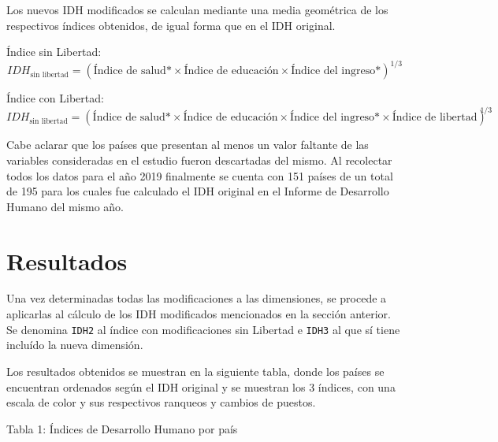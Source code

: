 \documentclass[
  10pt,
]{article}
\begin{document}
Los nuevos IDH modificados se calculan mediante una media geométrica de
los respectivos índices obtenidos, de igual forma que en el IDH
original.

Índice sin Libertad:
\[IDH_\text{sin libertad} = (\text{Índice de salud*}\times\text{Índice de educación}\times\text{Índice del ingreso*})^{1/3}\]

Índice con Libertad:
\[IDH_\text{sin libertad} = (\text{Índice de salud*}\times\text{Índice de educación}\times\text{Índice del ingreso*}\times\text{Índice de libertad})^{1/3}\]

Cabe aclarar que los países que presentan al menos un valor faltante de
las variables consideradas en el estudio fueron descartadas del mismo.
Al recolectar todos los datos para el año 2019 finalmente se cuenta con
151 países de un total de 195 para los cuales fue calculado el IDH
original en el Informe de Desarrollo Humano del mismo año.

\section{Resultados}\label{resultados}

Una vez determinadas todas las modificaciones a las dimensiones, se
procede a aplicarlas al cálculo de los IDH modificados mencionados en la
sección anterior. Se denomina \texttt{IDH2} al índice con modificaciones
sin Libertad e \texttt{IDH3} al que sí tiene incluído la nueva
dimensión.

Los resultados obtenidos se muestran en la siguiente tabla, donde los
países se encuentran ordenados según el IDH original y se muestran los 3
índices, con una escala de color y sus respectivos ranqueos y cambios de
puestos.

\pagebreak

Tabla 1: Índices de Desarrollo Humano por país
\end{document}
